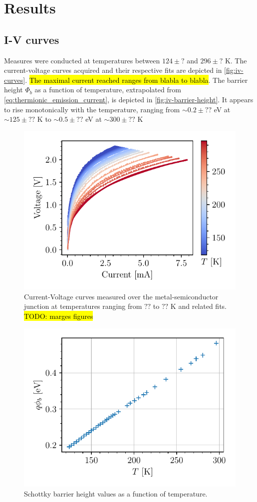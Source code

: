 \section{Results}
\subsection{I-V curves}
Measures were conducted at temperatures between $124 \pm ?$ and $296\pm?$ K. 
The current-voltage curves acquired and their respective fits are depicted in \autoref{fig:iv-curves}.
\hl{The maximal current reached ranges from blabla to blabla}.
The barrier height $\Phi_b$ as a function of temperature, extrapolated from \autoref{eq:thermionic_emission_current}, is depicted in \autoref{fig:iv-barrier-height}.
It appears to rise monotonically with the temperature, ranging from $\sim 0.2 \pm ??$ eV at $\sim 125 \pm ??$ K to $\sim 0.5 \pm ??$ eV at $\sim 300 \pm ??$ K

\begin{figure}[htbp]
    \centering
    \includegraphics[scale=1]{figures/iv-curves.pdf}
    \caption{Current-Voltage curves measured over the metal-semiconductor junction at temperatures ranging from $??$ to $??$ K and related fits. \hl{TODO: marges figures}}
    \label{fig:iv-curves}
\end{figure}

\begin{figure}[htbp]
    \centering
    \includegraphics[scale=1]{figures/iv-schottky-potential-temperature.pdf}
    \caption{Schottky barrier height values as a function of temperature. }
    \label{fig:iv-barrier-height}
\end{figure}
